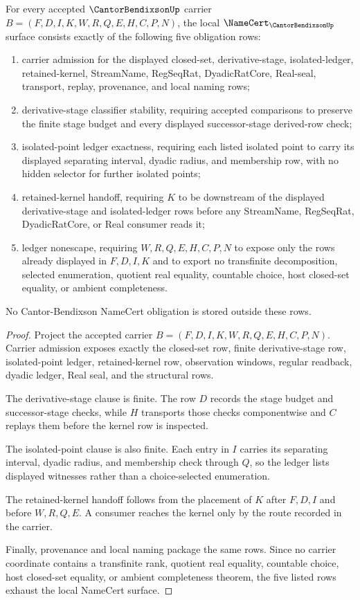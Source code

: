 \begin{theorem}
\label{thm:cantor-bendixson-namecert-obligations}
For every accepted $\CantorBendixsonUp$ carrier $B=(F,D,I,K,W,R,Q,E,H,C,P,N)$, the local $\NameCert_{\CantorBendixsonUp}$ surface consists exactly of the following five obligation rows:
\begin{enumerate}
\item carrier admission for the displayed closed-set, derivative-stage, isolated-ledger, retained-kernel, StreamName, RegSeqRat, DyadicRatCore, Real-seal, transport, replay, provenance, and local naming rows;
\item derivative-stage classifier stability, requiring accepted comparisons to preserve the finite stage budget and every displayed successor-stage derived-row check;
\item isolated-point ledger exactness, requiring each listed isolated point to carry its displayed separating interval, dyadic radius, and membership row, with no hidden selector for further isolated points;
\item retained-kernel handoff, requiring $K$ to be downstream of the displayed derivative-stage and isolated-ledger rows before any StreamName, RegSeqRat, DyadicRatCore, or Real consumer reads it;
\item ledger nonescape, requiring $W,R,Q,E,H,C,P,N$ to expose only the rows already displayed in $F,D,I,K$ and to export no transfinite decomposition, selected enumeration, quotient real equality, countable choice, host closed-set equality, or ambient completeness.
\end{enumerate}
No Cantor-Bendixson NameCert obligation is stored outside these rows.
\end{theorem}
\begin{proof}
Project the accepted carrier $B=(F,D,I,K,W,R,Q,E,H,C,P,N)$. Carrier admission exposes exactly the closed-set row, finite derivative-stage row, isolated-point ledger, retained-kernel row, observation windows, regular readback, dyadic ledger, Real seal, and the structural rows.

The derivative-stage clause is finite. The row $D$ records the stage budget and successor-stage checks, while $H$ transports those checks componentwise and $C$ replays them before the kernel row is inspected.

The isolated-point clause is also finite. Each entry in $I$ carries its separating interval, dyadic radius, and membership check through $Q$, so the ledger lists displayed witnesses rather than a choice-selected enumeration.

The retained-kernel handoff follows from the placement of $K$ after $F,D,I$ and before $W,R,Q,E$. A consumer reaches the kernel only by the route recorded in the carrier.

Finally, provenance and local naming package the same rows. Since no carrier coordinate contains a transfinite rank, quotient real equality, countable choice, host closed-set equality, or ambient completeness theorem, the five listed rows exhaust the local NameCert surface.
\end{proof}

